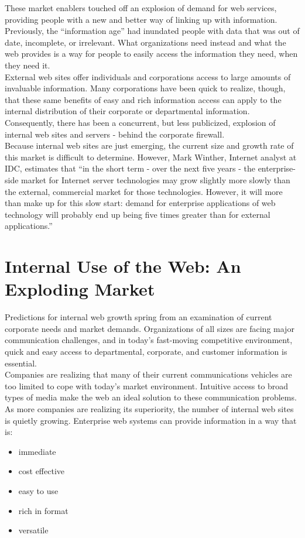 These market enablers touched off an explosion of demand for web
services, providing people with a new and better way of linking up with
information. Previously, the ``information age'' had inundated people
with data that was out of date, incomplete, or irrelevant. What
organizations need instead and what the web provides is a way for
people to easily access the information they need, when they need it.\\

External web sites offer individuals and corporations access to large
amounts of invaluable information. Many corporations have been quick to
realize, though, that these same benefits of easy and rich information
access can apply to the internal distribution of their corporate or
departmental information. Consequently, there has been a concurrent,
but less publicized, explosion of internal web sites and servers -
behind the corporate firewall.\\

Because internal web sites are just emerging, the current size and
growth rate of this market is difficult to determine. However, Mark
Winther, Internet analyst at IDC, estimates that ``in the short term -
over the next five years - the enterprise-side market for Internet
server technologies may grow slightly more slowly than the external,
commercial market for those technologies. However, it will more than
make up for this slow start: demand for enterprise applications of web
technology will probably end up being five times greater than for
external applications.''


\section{Internal Use of the Web: An Exploding Market}

Predictions for internal web growth spring from an examination of
current corporate needs and market demands. Organizations of all sizes
are facing major communication challenges, and in today's fast-moving
competitive environment, quick and easy access to departmental,
corporate, and customer information is essential.\\

Companies are realizing that many of their current communications
vehicles are too limited to cope with today's market environment.
Intuitive access to broad types of media make the web an ideal solution
to these communication problems. As more companies are realizing its
superiority, the number of internal web sites is quietly growing.
Enterprise web systems can provide information in a way that is:
\begin{itemize}
  \item immediate
  \item cost effective
  \item easy to use
  \item rich in format
  \item versatile
\end{itemize}

